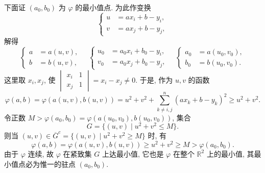 \begin{solution}
下面证 $(a_{0}, b_{0})$ 为 $\varphi$ 的最小值点. 为此作变换
\[
  \left\{\begin{aligned}
    u &= ax_{i} + b - y_{i}, \\
    v &= ax_{j} + b - y_{j},
  \end{aligned}\right.
\]
解得
\[
  \left\{\begin{aligned}
    a &= a(u, v), \\
    b &= b(u, v),
  \end{aligned}\right. \quad \left\{\begin{aligned}
    u_{0} &= a_{0}x_{i} + b_{0} - y_{i}, \\
    v_{0} &= a_{0}x_{j} + b_{0} - y_{j},
  \end{aligned}\right. \quad \left\{\begin{aligned}
    a_{0} &= a(u_{0}, v_{0}), \\
    b_{0} &= b(u_{0}, v_{0}).
  \end{aligned}\right.
\]
这里取 $x_{i}, x_{j}$, 使 $\begin{vmatrix} x_{i} & 1 \\ x_{j} & 1 \end{vmatrix} = x_{i} - x_{j} \neq 0$. 于是, 作为 $u, v$ 的函数
\[
  \varphi(a, b) = \varphi(a(u, v), b(u, v)) = u^{2} + v^{2} + \sum_{k \neq i,j}^{n}(ax_{k} + b - y_{k})^{2} \geqslant u^{2} + v^{2}.
\]
令正数 $M > \varphi(a_{0}, b_{0}) = \varphi(a(u_{0}, v_{0}), b(u_{0}, v_{0}))$, 集合
\[
  G = \{(u, v) \mid u^{2} + v^{2} \leqslant M\}.
\]
则当 $(u, v) \in \overline{G}^{c} = \{(u, v) \mid u^{2} + v^{2} \geqslant M\}$ 时, 有
\[
  \varphi(a, b) = \varphi(a(u, v), b(u, v)) \geqslant u^{2} + v^{2} \geqslant M > \varphi(a_{0}, b_{0}).
\]
由于 $\varphi$ 连续, 故 $\varphi$ 在紧致集 $G$ 上达最小值, 它也是 $\varphi$ 在整个 $\mathbb{R}^{2}$ 上的最小值, 其最小值点必为惟一的驻点 $(a_{0}, b_{0})$.


\end{solution}
